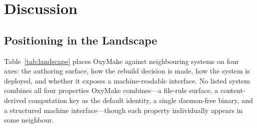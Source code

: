 \documentclass[12pt,a4paper]{article}
\begin{document}
\section{Discussion}
\label{sec:discussion}

\subsection{Positioning in the Landscape}

Table~\ref{tab:landscape} places OxyMake against neighbouring systems on
four axes: the authoring surface, how the rebuild decision is made, how
the system is deployed, and whether it exposes a machine-readable
interface. No listed system combines all four properties
OxyMake combines---a file-rule surface, a
content-derived computation key as the default identity, a single daemon-free binary, and a
structured machine interface---though each property individually
appears in some neighbour.
\end{document}
